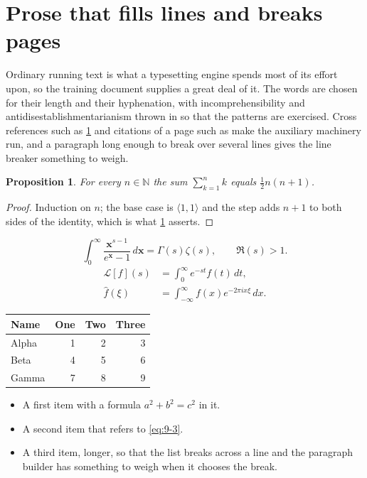 \documentclass[11pt,a4paper]{report}
\theoremstyle{plain}
\newtheorem{proposition}{Proposition}[chapter]
\newcommand{\vecn}[1]{\mathbf{#1}}
\newcommand{\pairs}[2]{\langle #1,#2\rangle}
\begin{document}
\section{Prose that fills lines and breaks pages}
\label{sec:prose9-3}
Ordinary running text is what a typesetting engine spends most of its effort
upon, so the training document supplies a great deal of it. The words are
chosen for their length and their hyphenation, with incomprehensibility and
antidisestablishmentarianism thrown in so that the patterns are exercised.
Cross references such as \cref{sec:prose9-3} and citations of a page such
as \pageref{sec:prose9-3} make the auxiliary machinery run, and a
paragraph long enough to break over several lines gives the line breaker
something to weigh.
\begin{proposition}\label{prop:9-3}
For every $n\in\mathbb{N}$ the sum $\sum_{k=1}^{n}k$ equals
$\tfrac{1}{2}n(n+1)$.
\end{proposition}
\begin{proof}
Induction on $n$; the base case is $\pairs{1}{1}$ and the step adds $n+1$ to
both sides of the identity, which is what \cref{prop:9-3} asserts.
\end{proof}
\begin{equation}\label{eq:9-3}
  \int_{0}^{\infty}\frac{\vecn{x}^{s-1}}{e^{\vecn{x}}-1}\,d\vecn{x}
    = \Gamma(s)\zeta(s),\qquad \Re(s)>1 .
\end{equation}
\begin{align}
  \mathcal{L}[f](s) &= \int_{0}^{\infty} e^{-st} f(t)\,dt, \\
  \widehat{f}(\xi)  &= \int_{-\infty}^{\infty} f(x) e^{-2\pi i x\xi}\,dx .
\end{align}
\par\noindent\begin{center}
\begin{tabular}{lrrr}
\hline
Name & One & Two & Three \\
\hline
Alpha & 1 & 2 & 3 \\
Beta & 4 & 5 & 6 \\
Gamma & 7 & 8 & 9 \\
\hline
\end{tabular}
\end{center}
\begin{itemize}
  \item A first item with a formula $a^2+b^2=c^2$ in it.
  \item A second item that refers to \eqref{eq:9-3}.
  \item A third item, longer, so that the list breaks across a line and the
    paragraph builder has something to weigh when it chooses the break.
\end{itemize}
\end{document}
